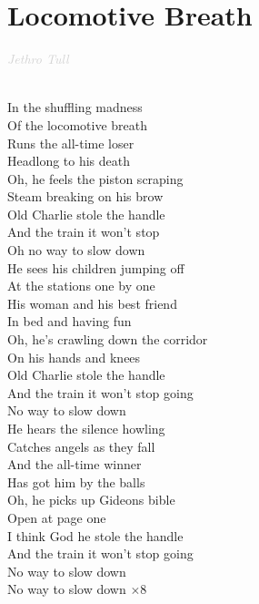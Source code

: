 \documentclass[a5paper, 10pt]{book}
\begin{document}
\section{Locomotive Breath}\textcolor{lightgray}{\textit{Jethro Tull}}\\~\\
\begin{minipage}[t]{0.8\textwidth}
  In the shuffling madness\\
  Of the locomotive breath\\
  Runs the all-time loser\\
  Headlong to his death\\
  Oh, he feels the piston scraping\\
  Steam breaking on his brow\\
  Old Charlie stole the handle\\
  And the train it won't stop\\
  Oh no way to slow down\\

  He sees his children jumping off\\
  At the stations one by one\\
  His woman and his best friend\\
  In bed and having fun\\
  Oh, he's crawling down the corridor\\
  On his hands and knees\\
  Old Charlie stole the handle\\
  And the train it won't stop going\\
  No way to slow down\\

  He hears the silence howling\\
  Catches angels as they fall\\
  And the all-time winner\\
  Has got him by the balls\\
  Oh, he picks up Gideons bible\\
  Open at page one\\
  I think God he stole the handle\\
  And the train it won't stop going\\
  No way to slow down\\

  No way to slow down \hspace*{10mm}$\times$8\\
\end{minipage}
\end{document}
